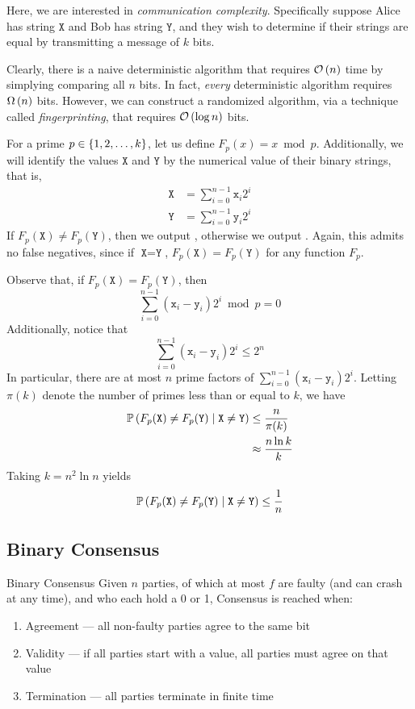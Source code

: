 Here, we are interested in \emph{communication complexity}. Specifically suppose
Alice has string $\texttt{X}$ and Bob has string $\texttt{Y}$, and they wish to
determine if their strings are equal by transmitting a message of $k$ bits.

Clearly, there is a naive deterministic algorithm that requires $\mathcal{O}\left(n\right)$ time
by simplying comparing all $n$ bits. In fact, \emph{every} deterministic
algorithm requires $\Omega\left(n\right)$ bits. However, we can construct a randomized
algorithm, via a technique called \emph{fingerprinting}, that requires
$\mathcal{O}\left(\log{n}\right)$ bits.

For a prime $p \in \left\lbrace1, 2, \dots, k\right\rbrace$, let us define $F_p(x) = x \bmod p$.
Additionally, we will identify the values $\texttt{X}$ and $\texttt{Y}$ by the
numerical value of their binary strings, that is,
\begin{align*}
    \texttt{X} &= \sum_{i=0}^{n-1}\texttt{x}_i 2^i\\
    \texttt{Y} &= \sum_{i=0}^{n-1}\texttt{y}_i 2^i 
\end{align*}
If $F_p(\texttt{X}) \neq F_p(\texttt{Y})$, then we output \False, otherwise we
output \True. Again, this admits no false negatives, since if $\texttt{X} =
\texttt{Y}$, $F_p(\texttt{X}) = F_p(\texttt{Y})$ for any function $F_p$.

Observe that, if $F_p(\texttt{X}) = F_p(\texttt{Y})$, then
\[\sum_{i=0}^{n-1}\left(\texttt{x}_i - \texttt{y}_i\right) 2^i \bmod p = 0\]
Additionally, notice that
\[\sum_{i=0}^{n-1}\left(\texttt{x}_i - \texttt{y}_i\right) 2^i \leq 2^n\]
In particular, there are at most $n$ prime factors of
$\sum_{i=0}^{n-1}\left(\texttt{x}_i - \texttt{y}_i\right) 2^i$. Letting $\pi(k)$
denote the number of primes less than or equal to $k$, we have
\begin{align*}\operatorname{\mathbb{P}}\left(F_p(\texttt{X}) \neq F_p(\texttt{Y}) \mid \texttt{X} \neq \texttt{Y}\right)
    &\leq \frac{n}{\pi(k)}\\
    &\approx \frac{n\ln{k}}{k}
\end{align*}
Taking $k = n^2\ln{n}$ yields
\[\operatorname{\mathbb{P}}\left(F_p(\texttt{X}) \neq F_p(\texttt{Y}) \mid \texttt{X} \neq \texttt{Y}\right) \leq \frac{1}{n}\]

\subsection{Binary Consensus}
\begin{problem}{Binary Consensus}{}
    Given $n$ parties, of which at most $f$ are faulty (and can crash at any
    time), and who each hold a 0 or 1, Consensus is reached when:
    \begin{enumerate}
        \item Agreement --- all non-faulty parties agree to the same bit
        \item Validity --- if all parties start with a value, all parties must
              agree on that value
        \item Termination --- all parties terminate in finite time
    \end{enumerate}
\end{problem}

